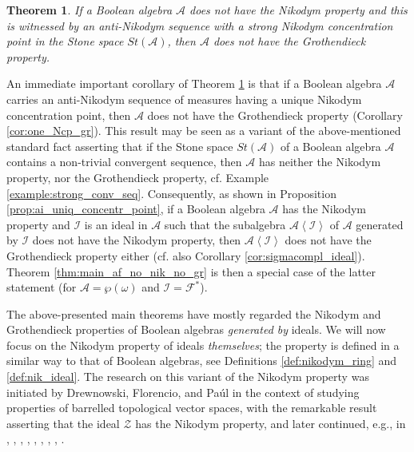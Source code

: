 \documentclass[a4paper,11pt,fleqn]{amsart}
\newtheorem{theoreml}{Theorem}[section]
\theoremstyle{definition}
\theoremstyle{remark}
\numberwithin{equation}{section}
\newcommand{\N}{\mathbb{N}}
\newcommand{\aA}{\mathcal{A}}
\newcommand{\fF}{\mathcal{F}}
\newcommand{\iI}{\mathcal{I}}
\newcommand{\zZ}{\mathcal{Z}}
\newcommand{\gen}[1]{\mathopen{}\left\langle#1\mathclose{}\right\rangle}
\newcommand{\wo}{{\wp(\omega)}}%
\begin{document}
\begin{theoreml}\label{thm:main_no_nik_no_gr}
    If a Boolean algebra $\aA$ does not have the Nikodym property and this is witnessed by an anti-Nikodym sequence with a strong Nikodym concentration point in the Stone space $St(\aA)$, then $\aA$ does not have the Grothendieck property.
\end{theoreml}

An immediate important corollary of Theorem \ref{thm:main_no_nik_no_gr} is that if a Boolean algebra $\aA$ carries an anti-Nikodym sequence of measures having a unique Nikodym concentration point, then $\aA$ does not have the Grothendieck property (Corollary \ref{cor:one_Ncp_gr}). This result may be seen as a variant of the above-mentioned standard fact asserting that if the Stone space $St(\aA)$ of a Boolean algebra $\aA$ contains a non-trivial convergent sequence, then $\aA$ has neither the Nikodym property, nor the Grothendieck property, cf. Example \ref{example:strong_conv_seq}. Consequently, as shown in Proposition \ref{prop:ai_uniq_concentr_point}, if a Boolean algebra $\aA$ has the Nikodym property and $\iI$ is an ideal in $\aA$ such that the subalgebra $\aA\gen{\iI}$ of $\aA$ generated by $\iI$ does not have the Nikodym property, then $\aA\gen{\iI}$ does not have the Grothendieck property either (cf. also Corollary \ref{cor:sigmacompl_ideal}). Theorem \ref{thm:main_af_no_nik_no_gr} is then a special case of the latter statement (for $\aA=\wo$ and $\iI=\fF^*$).

\medskip

The above-presented main theorems have mostly regarded the Nikodym and Grothendieck properties of Boolean algebras \textit{generated by} ideals. We will now focus on the Nikodym property of ideals \textit{themselves}; the property is defined in a similar way to that of Boolean algebras, see Definitions \ref{def:nikodym_ring} and \ref{def:nik_ideal}. The research on this variant of the Nikodym property was initiated by Drewnowski, Florencio, and Pa\'ul \cite{DFP94} in the context of studying properties of barrelled topological vector spaces, with the remarkable result asserting that the ideal $\zZ$ has the Nikodym property, and later continued, e.g., in  \cite{ADL09}, \cite{BBL02}, \cite{BL13}, \cite{DFP96}, \cite{DP00}, \cite{Fer02}, \cite{FLALP}, \cite{SA04}, \cite{Stu07}.
\end{document}
